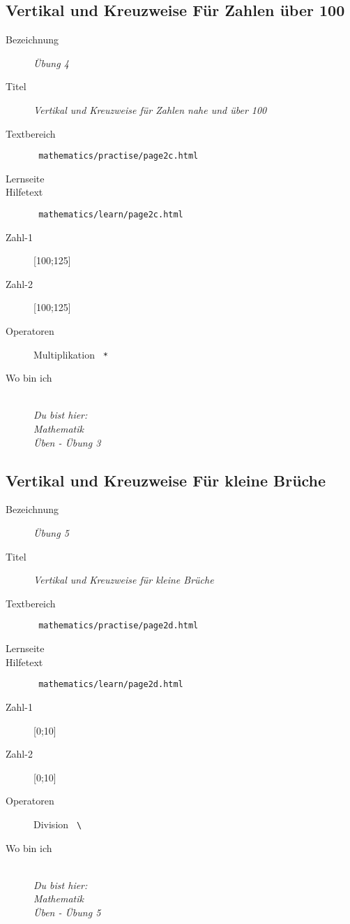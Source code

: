 \subsection{ Vertikal und Kreuzweise Für Zahlen über 100 }
\label{cha:math-practise-page4}
\begin{description}
  \item[Bezeichnung] \emph{ Übung 4 }
  \item[Titel] \emph{ Vertikal und Kreuzweise für Zahlen nahe und über 100 }
  \item[Textbereich] \texttt{ mathematics/practise/page2c.html }
  \item[Lernseite] 
  \item[Hilfetext] \texttt{ mathematics/learn/page2c.html }
  \item[Zahl-1] [100;125]
  \item[Zahl-2] [100;125]
  \item[Operatoren] Multiplikation \texttt{ * }
  \item[Wo bin ich] \emph{\\Du bist hier:\\Mathematik\\Üben - Übung 3}
\end{description}



\subsection{ Vertikal und Kreuzweise Für kleine Brüche }
\label{cha:math-practise-page5}
\begin{description}
  \item[Bezeichnung] \emph{ Übung 5 }
  \item[Titel] \emph{ Vertikal und Kreuzweise für kleine Brüche }
  \item[Textbereich] \texttt{ mathematics/practise/page2d.html }
  \item[Lernseite] 
  \item[Hilfetext] \texttt{ mathematics/learn/page2d.html }
  \item[Zahl-1] [0;10]
  \item[Zahl-2] [0;10]
  \item[Operatoren] Division \texttt{ \textbackslash }
  \item[Wo bin ich] \emph{\\Du bist hier:\\Mathematik\\Üben - Übung 5}
\end{description}


